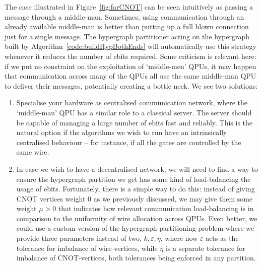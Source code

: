 The case illustrated in Figure~\ref{fig:farCNOT} can be seen intuitively as passing a message through a middle-man. Sometimes, using communication through an already available middle-man is better than putting up a full blown connection just for a single message. The hypergraph partitioner acting on the hypergraph built by Algorithm~\ref{code:buildHypBothEnds} will automatically use this strategy whenever it reduces the number of ebits required. Some criticism is relevant here: if we put no constraint on the exploitation of `middle-men' QPUs, it may happen that communication across many of the QPUs all use the same middle-man QPU to deliver their messages, potentially creating a bottle neck. We see two solutions:


\begin{enumerate}
\item Specialise your hardware as centralised communication network, where the `middle-man' QPU has a similar role to a classical server. The server should be capable of managing a large number of ebits fast and reliably. This is the natural option if the algorithms we wish to run have an intrinsically centralised behaviour -- for instance, if all the gates are controlled by the same wire.

\item In case we wish to have a decentralised network, we will need to find a way to ensure the hypergraph partition we get has some kind of load-balancing the usage of ebits. Fortunately, there is a simple way to do this: instead of giving CNOT vertices weight \(0\) as we previously discussed, we may give them some weight \(\mu > 0\) that indicates how relevant communication load-balancing is in comparison to the uniformity of wire allocation across QPUs. Even better, we could use a custom version of the hypergraph partitioning problem where we provide three parameters instead of two, \(k,\varepsilon,\eta\), where now \(\varepsilon\) acts as the tolerance for imbalance of wire-vertices, while \(\eta\) is a separate tolerance for imbalance of CNOT-vertices, both tolerances being enforced in any partition.
\end{enumerate}

